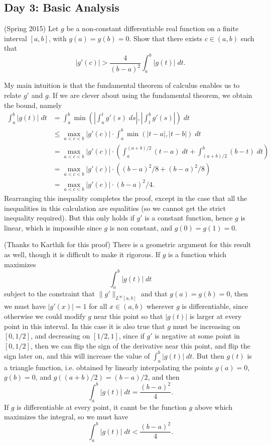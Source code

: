 \documentclass[answers]{exam}
\theoremstyle{problemstyle}
\newcommand{\1}[1]{\textbf{1}_{\left[#1\right]}} %
\begin{document}
\begin{questions}
\newpage
\section{Day 3: Basic Analysis}

\question (Spring 2015) Let $g$ be a non-constant differentiable real function on a finite interval $[a,b]$, with $g(a) = g(b) = 0$. Show that there exists $c \in (a,b)$ such that
%
\[ |g'(c)| > \frac{4}{(b - a)^2} \int_a^b |g(t)|\; dt. \]
\begin{solution}
	My main intuition is that the fundamental theorem of calculus enables us to relate $g'$ and $g$. If we are clever about using the fundamental theorem, we obtain the bound, namely
	\begin{align*}
		\int_a^b |g(t)|\; dt &= \int_a^b \min \left( \left| \int_a^t g'(s)\; ds \right|, \left| \int_t^b g'(s) \right| \right)\; dt\\
		&\leq \max_{a < c < b} |g'(c)| \cdot \int_a^b \min(|t - a|, |t - b|)\; dt\\
		&= \max_{a < c < b} |g'(c)| \cdot \left( \int_a^{(a + b)/2} (t - a)\; dt + \int_{(a + b)/2}^b (b - t)\; dt \right)\\
		&= \max_{a < c < b} |g'(c)| \cdot \left( (b - a)^2/8 + (b - a)^2/8 \right)\\
		&= \max_{a < c < b} |g'(c)| \cdot (b-a)^2/4.
	\end{align*}
	Rearranging this inequality completes the proof, except in the case that all the inequalities in this calculation are equalities (so we cannot get the strict inequality required). But this only holds if $g'$ is a constant function, hence $g$ is linear, which is impossible since $g$ is non constant, and $g(0) = g(1) = 0$.

	(Thanks to Karthik for this proof) There is a geometric argument for this result as well, though it is difficult to make it rigorous. If $g$ is a function which maximizes
	\[ \int_a^b |g(t)|\; dt \]
	subject to the constraint that $\| g' \|_{L^\infty[a,b]}$ and that $g(a) = g(b) = 0$, then we must have $|g'(x)| = 1$ for all $x \in (a,b)$ wherever $g$ is differentiable, since otherwise we could modify $g$ near this point so that $|g(t)|$ is larger at every point in this interval. In this case it is also true that $g$ must be increasing on $[0,1/2]$, and decreasing on $[1/2,1]$, since if $g'$ is negative at some point in $[0,1/2]$, then we can flip the sign of the derivative near this point, and flip the sign later on, and this will increase the value of $\int_a^b |g(t)|\; dt$. But then $g(t)$ is a triangle function, i.e. obtained by linearly interpolating the points $g(a) = 0$, $g(b) = 0$, and $g((a + b)/2) = (b - a)/2$, and then
	\[ \int_a^b |g(t)|\; dt = \frac{(b - a)^2}{4}. \]
	If $g$ is differentiable at every point, it cannt be the function $g$ above which maximizes the integral, so we must have
	\[ \int_a^b |g(t)|\; dt < \frac{(b - a)^2}{4}. \]
\end{solution}


\end{questions}
\end{document}
